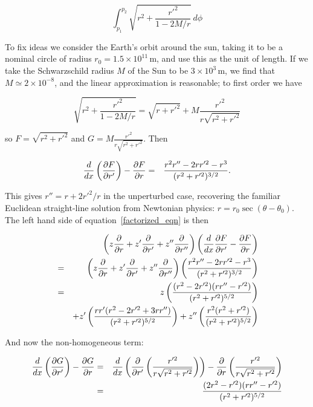 \documentclass[pdflatex,sn-mathphys-num]{sn-jnl}%
\theoremstyle{thmstyleone}%
\theoremstyle{thmstyletwo}%
\theoremstyle{thmstylethree}%
\begin{document}
\begin{equation}
  \int_{p_1}^{p_2}\sqrt{r^2 + \frac{r'^2}{1-2M/r}}\,d\phi
\end{equation}

To fix ideas we consider the Earth's orbit around the sun, taking it
to be a nominal circle of radius $r_0=1.5\times 10^{11}\,\mathrm{m}$,
and use this as the unit of length.  If we take the Schwarzschild
radius $M$ of the Sun to be $3\times 10^3\,\mathrm{m}$, we find that
$M\simeq 2\times 10^{-8}$, and the linear approximation is reasonable;
to first order we have

\begin{equation}
\sqrt{r^2 + \frac{r'^2}{1-2M/r}}=\sqrt{r+r'^2} + M\frac{r'^2}{r\sqrt{r^2 + r'^2}}
\end{equation}
  
so $F=\sqrt{r^2+r'^2}$ and $G=M\frac{r'^2}{r\sqrt{r^2+r'^2}}$.  Then

\begin{eqnarray}
\frac{d}{dx}\left(\frac{\partial{F}}{\partial{r'}}\right) -\frac{\partial{F}}{\partial{r}} &=& 
\frac{r^2r''- 2rr'^2 -r^3}{(r^2 +r'^2)^{3/2}}.
\end{eqnarray}

This gives $r'' = r + 2r'^2/r$ in the unperturbed case, recovering the
familiar Euclidean straight-line solution from Newtonian physics:
$r=r_0\sec(\theta-\theta_0)$.  The left hand side of
equation~\ref{factorized_eqn} is then

\begin{eqnarray}
&{}& \left(z\frac{\partial{}}{\partial{r}} + z'\frac{\partial{}}{\partial{r'}} + z''\frac{\partial{}}{\partial{r''}}\right)
\left(\frac{d}{dx}\frac{\partial{F}}{\partial{r'}}
-\frac{\partial{F}}{\partial{r}}\right)\nonumber\\
&=&  \left(z\frac{\partial{}}{\partial{r}} + z'\frac{\partial{}}{\partial{r'}} + z''\frac{\partial{}}{\partial{r''}}\right)
\left(\frac{r^2r''- 2rr'^2 -r^3}{(r^2 +r'^2)^{3/2}}\right)\nonumber\\
&=& 
 z  \left(\frac{(r^2 - 2r'^2)(rr''-r'^2)}{(r^2 + r'^2)^{5/2}}\right)\nonumber\\
 &{}& + z' \left(\frac{rr'(r^2 - 2r'^2 + 3rr'')}{(r^2 + r'^2)^{5/2}}\right)
      + z''\left(\frac{r^2    (r^2+r'^2)       }{(r^2 + r'^2)^{5/2}}\right)
\end{eqnarray}

And now the non-homogeneous term:

\begin{eqnarray}
\frac{d}{dx}\left(\frac{\partial{G}}{\partial{r'}}\right) -\frac{\partial{G}}{\partial{r}} &=& 
\frac{d}{dx}\left(\frac{\partial}{\partial r'}\left(\frac{r'^2}{r\sqrt{r^2+r'^2}}\right)\right)
- \frac{\partial}{\partial
  r}\left(\frac{r'^2}{r\sqrt{r^2+r'^2}}\right)\nonumber\\
&=& \frac{(2r^2-r'^2)(rr''-r'^2)}{(r^2+r'^2)^{5/2}}
\end{eqnarray}
\end{document}
